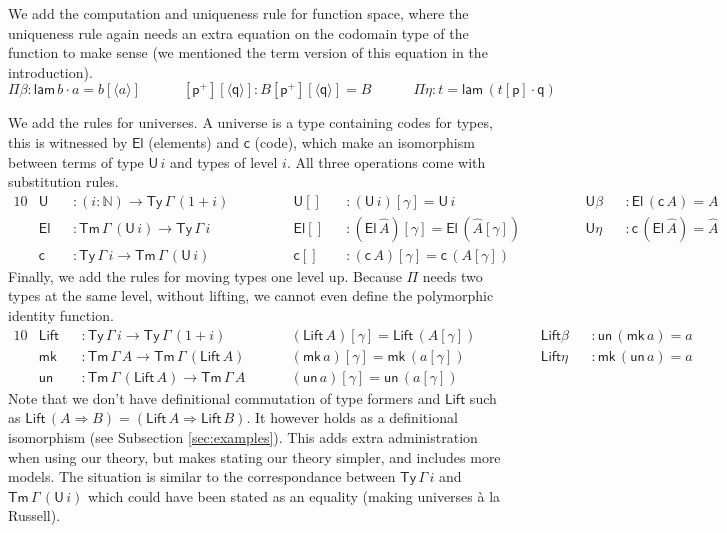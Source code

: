 \documentclass[a4paper,UKenglish,cleveref, autoref, thm-restate]{lipics-v2021}
\newcommand{\ra}{\rightarrow}
\newcommand{\Ra}{\Rightarrow}
\newcommand{\Ty}{\mathsf{Ty}}
\newcommand{\Tm}{\mathsf{Tm}}
\newcommand{\p}{\mathsf{p}}
\newcommand{\q}{\mathsf{q}}
\newcommand{\N}{\mathbb{N}}
\newcommand{\lam}{\mathsf{lam}}
\newcommand{\U}{\mathsf{U}}
\newcommand{\El}{\mathsf{El}}
\newcommand{\cd}{\mathsf{c}}
\newcommand{\Lift}{\mathsf{Lift}}
\newcommand{\mk}{\mathsf{mk}}
\newcommand{\un}{\mathsf{un}}
\begin{document}
We add the computation and uniqueness rule for function space, where
the uniqueness rule again needs an extra equation on the codomain type
of the function to make sense (we mentioned the term version of this equation in the introduction).
\[
\Pi\beta : \lam\,b\cdot a = b[\langle a\rangle] \hspace{3em}
[\p^+][\langle\q\rangle] : B[\p^+][\langle\q\rangle] = B \hspace{3em}
\Pi\eta : t = \lam\,(t[\p]\cdot\q)
\]

We add the rules for universes. A universe is a type containing codes
for types, this is witnessed by $\El$ (elements) and $\cd$ (code),
which make an isomorphism between terms of type $\U\,i$ and types of
level $i$. All three operations come with substitution rules.
\begin{alignat*}{10}
  & \U && : (i:\N)\ra\Ty\,\Gamma\,(1+i)\hspace{3em} && \U[] && : (\U\,i)[\gamma] = \U\,i                           && \U\beta && : \El\,(\cd\,A) = A \\        
  & \El && : \Tm\,\Gamma\,(\U\,i) \ra \Ty\,\Gamma\,i && \El[] && : (\El\,\hat{A})[\gamma] = \El\,(\hat{A}[\gamma]) \hspace{3em} && \U\eta && : \cd\,(\El\,\hat{A}) = \hat{A} \\
  & \cd && : \Ty\,\Gamma\,i\ra\Tm\,\Gamma\,(\U\,i) && \cd[] && : (\cd\,A)[\gamma] = \cd\,(A[\gamma])
\end{alignat*}
Finally, we add the rules for moving types one level up. Because $\Pi$
needs two types at the same level, without lifting, we cannot even
define the polymorphic identity function.
\begin{alignat*}{10}
  & \Lift && : \Ty\,\Gamma\,i\ra\Ty\,\Gamma\,(1+i)\hspace{3em} && (\Lift\,A)[\gamma] = \Lift\,(A[\gamma])\hspace{3em} && \Lift\beta && : \un\,(\mk\,a) = a \\
  & \mk && : \Tm\,\Gamma\,A \ra \Tm\,\Gamma\,(\Lift\,A) && (\mk\,a)[\gamma] = \mk\,(a[\gamma])              && \Lift\eta && : \mk\,(\un\,a) = a \\
  & \un && : \Tm\,\Gamma\,(\Lift\,A) \ra \Tm\,\Gamma\,A && (\un\,a)[\gamma] = \un\,(a[\gamma])
\end{alignat*}
Note that we don't have definitional commutation of type formers and
$\Lift$ such as $\Lift\,(A\Ra B) = (\Lift\,A\Ra\Lift\,B)$. It however
holds as a definitional isomorphism (see Subsection
\ref{sec:examples}). This adds extra administration when using our
theory, but makes stating our theory simpler, and includes more
models. The situation is similar to the correspondance between
$\Ty\,\Gamma\,i$ and $\Tm\,\Gamma\,(\U\,i)$ which could have been
stated as an equality (making universes {\`a} la Russell).
\end{document}
